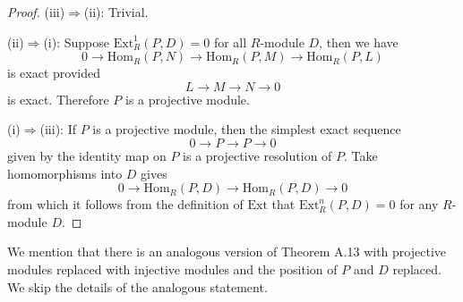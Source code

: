 \begin{proof}
(iii)$\Rightarrow$(ii): Trivial.\par
(ii)$\Rightarrow$(i): Suppose $\mathrm{Ext}_R^1(P,D)=0$ for all $R$-module $D$, then we have 
$$
0\longrightarrow \mathrm{Hom}_R\left( P,N \right) \longrightarrow \mathrm{Hom}_R\left( P,M \right) \longrightarrow \mathrm{Hom}_R\left( P,L \right) 
$$
is exact provided 
$$
L\longrightarrow M\longrightarrow N\longrightarrow 0
$$
is exact. Therefore $P$ is a projective module.\par
(i)$\Rightarrow$(iii): If $P$ is a projective module, then the simplest exact sequence 
$$
0\longrightarrow P\longrightarrow P\longrightarrow 0
$$
given by the identity map on $P$ is a projective resolution of $P$. Take homomorphisms into $D$ gives 
$$
0\longrightarrow \mathrm{Hom}_R\left( P,D \right) \longrightarrow \mathrm{Hom}_R\left( P,D \right) \longrightarrow 0
$$
from which it follows from the definition of $\mathrm{Ext}$ that $\mathrm{Ext}_R^n(P,D)=0$ for any $R$-module $D$.
\end{proof}
We mention that there is  an analogous version of Theorem A.13 with projective modules replaced with injective modules and the position of $P$ and $D$ replaced. We skip the details of the analogous statement.